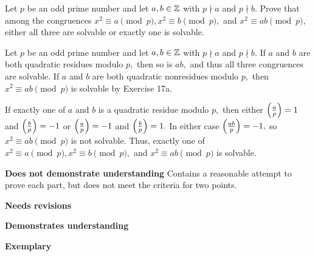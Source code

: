 \documentclass[letterpaper, 11pt]{ximera}
\begin{document}
\begin{ex}
 	Let $p$ be an odd prime number and let $a,b\in\mathbb Z$ with $p\nmid a$ and $p\nmid b.$ Prove that among the congruences $x^2\equiv a\pmod{p}, x^2\equiv b\pmod{p},$ and $x^2\equiv ab\pmod{p},$ either all three are solvable or exactly one is solvable.

	\begin{solution}
		Let $p$ be an odd prime number and let $a,b\in\mathbb Z$ with $p\nmid a$ and $p\nmid b.$ If $a$ and $b$ are both quadratic residues modulo $p,$ then so is $ab,$ and thus all three congruences are solvable. If $a$ and $b$ are both quadratic nonresidues modulo $p,$ then $x^2\equiv ab\pmod{p}$ is solvable by Exercise 17a.

		If exactly one of $a$ and $b$ is a quadratic residue modulo $p,$ then either $\left(\frac{a}{p}\right)=1$ and $\left(\frac{b}{p}\right)=-1$ or $\left(\frac{a}{p}\right)=-1$ and $\left(\frac{b}{p}\right)=1.$ In either case $\left(\frac{ab}{p}\right)=-1,$ so  $x^2\equiv ab\pmod{p}$ is not solvable. Thus, exactly one of $x^2\equiv a\pmod{p}, x^2\equiv b\pmod{p},$ and $x^2\equiv ab\pmod{p}$ is solvable.
	\end{solution}

\begin{writeRubric}
    \item \textbf{Does not demonstrate understanding}
     Contains a reasonable attempt to prove each part, but does not meet the criteria for two points.
    \item \textbf{Needs revisions}
     
    \item \textbf{Demonstrates understanding}
    
    \item \textbf{Exemplary}
        
\end{writeRubric}
\end{ex}                                       
\end{document}
